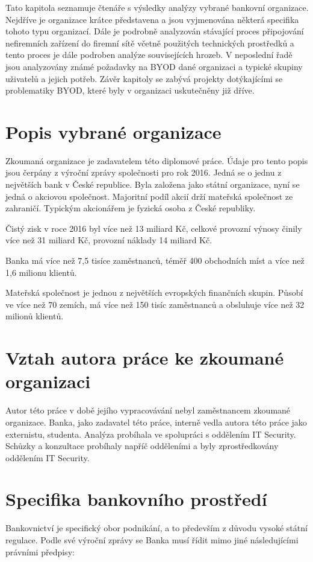 Tato kapitola seznamuje čtenáře s výsledky analýzy vybrané bankovní organizace. Nejdříve je organizace krátce představena a jsou vyjmenována některá specifika tohoto typu organizací. Dále je podrobně analyzován stávající proces připojování nefiremních zařízení do firemní sítě včetně použitých technických prostředků a tento proces je dále podroben analýze souvisejících hrozeb. V neposlední řadě jsou analyzovány známé požadavky na BYOD dané organizaci a typické skupiny uživatelů a jejich potřeb. Závěr kapitoly se zabývá projekty dotýkajícími se problematiky BYOD, které byly v organizaci uskutečněny již dříve.

\section{Popis vybrané organizace}
Zkoumaná organizace je zadavatelem této diplomové práce. Údaje pro tento popis jsou čerpány z výroční zprávy společnosti pro rok 2016. Jedná se o jednu z největších bank v České republice. Byla založena jako státní organizace, nyní se jedná o akciovou společnost. Majoritní podíl akcií drží mateřská společnost ze zahraničí. Typickým akcionářem je fyzická osoba z České republiky.

Čistý zisk v roce 2016 byl více než 13 miliard Kč, celkové provozní výnosy činily více než 31 miliard Kč, provozní náklady 14 miliard Kč.

Banka má více než 7,5 tisíce zaměstnanců, téměř 400 obchodních míst a více než 1,6 milionu klientů.  

Mateřská společnost je jednou z největších evropských finančních skupin. Působí ve více než 70 zemích, má více než 150 tisíc zaměstnanců a obsluhuje více než 32 milionů klientů. 

\section{Vztah autora práce ke zkoumané organizaci}
Autor této práce v době jejího vypracovávání nebyl zaměstnancem zkoumané organizace. Banka, jako zadavatel této práce, interně vedla autora této práce jako externistu, studenta. Analýza probíhala ve spolupráci s oddělením IT Security. Schůzky a konzultace probíhaly napříč odděleními a byly zprostředkovány oddělením IT Security. 

\section{Specifika bankovního prostředí}
Bankovnictví je specifický obor podnikání, a to především z důvodu vysoké státní regulace. Podle své výroční zprávy se Banka musí řídit mimo jiné následujícími právními předpisy:

